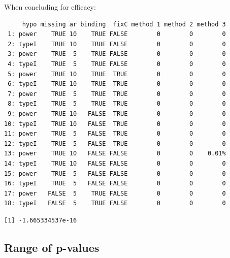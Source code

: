 \documentclass[12pt]{article}
\begin{document}
When concluding for efficacy:
\begin{verbatim}
     hypo missing ar binding  fixC method 1 method 2 method 3
 1: power    TRUE 10    TRUE FALSE        0        0        0
 2: typeI    TRUE 10    TRUE FALSE        0        0        0
 3: power    TRUE  5    TRUE FALSE        0        0        0
 4: typeI    TRUE  5    TRUE FALSE        0        0        0
 5: power    TRUE 10    TRUE  TRUE        0        0        0
 6: typeI    TRUE 10    TRUE  TRUE        0        0        0
 7: power    TRUE  5    TRUE  TRUE        0        0        0
 8: typeI    TRUE  5    TRUE  TRUE        0        0        0
 9: power    TRUE 10   FALSE  TRUE        0        0        0
10: typeI    TRUE 10   FALSE  TRUE        0        0        0
11: power    TRUE  5   FALSE  TRUE        0        0        0
12: typeI    TRUE  5   FALSE  TRUE        0        0        0
13: power    TRUE 10   FALSE FALSE        0        0    0.01%
14: typeI    TRUE 10   FALSE FALSE        0        0        0
15: power    TRUE  5   FALSE FALSE        0        0        0
16: typeI    TRUE  5   FALSE FALSE        0        0        0
17: power   FALSE  5    TRUE FALSE        0        0        0
18: typeI   FALSE  5    TRUE FALSE        0        0        0
\end{verbatim}

\begin{verbatim}
[1] -1.665334537e-16
\end{verbatim}




\subsection{Range of p-values}
\label{sec:org9fa6c4b}
\end{document}
